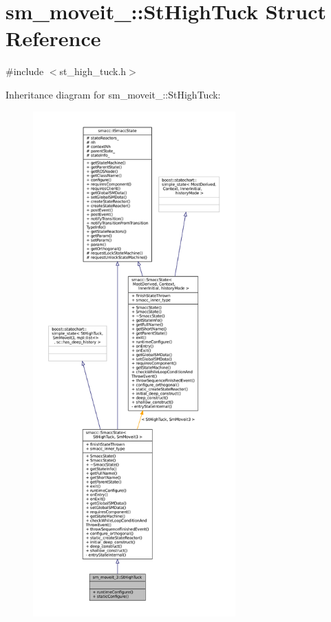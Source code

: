 \hypertarget{structsm__moveit__3_1_1StHighTuck}{}\section{sm\+\_\+moveit\+\_\+:\+:St\+High\+Tuck Struct Reference}
\label{structsm__moveit__3_1_1StHighTuck}


{\ttfamily \#include $<$st\+\_\+high\+\_\+tuck.\+h$>$}



Inheritance diagram for sm\+\_\+moveit\+\_\+:\+:St\+High\+Tuck\+:
\nopagebreak
\begin{figure}[H]
\begin{center}
\leavevmode
\includegraphics[height=550pt]{structsm__moveit__3_1_1StHighTuck__inherit__graph}
\end{center}
\end{figure}


